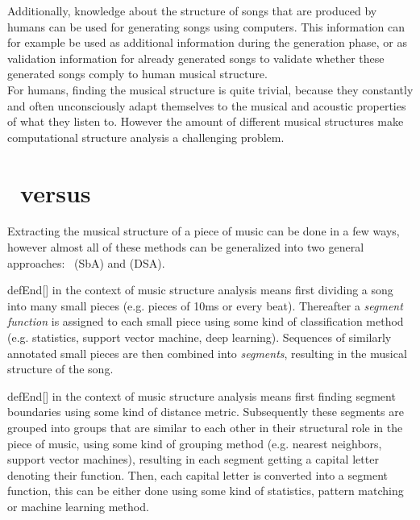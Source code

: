 Additionally, knowledge about the structure of songs that are produced by humans can be used for generating songs using computers. This information can for example be used as additional information during the generation phase, or as validation information for already generated songs to validate whether these generated songs comply to human musical structure.\\

For humans, finding the musical structure is quite trivial, because they constantly and often unconsciously adapt themselves to the musical and acoustic properties of what they listen to. However the amount of different musical structures make computational structure analysis a challenging problem.


\section[SbA vs DSA]{\sba\ versus\\ \dsa}
Extracting the musical structure of a piece of music can be done in a few ways, however almost all of these methods can be generalized into two general approaches: \textit{\sba}\ (SbA) and \textit{\dsa} (DSA).

\begin{theoremEnd}[restate,category=def]{defEnd}[\sba]
    \label{def:SbA}
    \textbf{\sba} in the context of music structure analysis means first dividing a song into many small pieces (e.g. pieces of 10ms or every beat). Thereafter a \textit{segment function} is assigned to each small piece using some kind of classification method (e.g. statistics, support vector machine, deep learning). Sequences of similarly annotated small pieces are then combined into \textit{segments}, resulting in the musical structure of the song.
\end{theoremEnd}

\begin{theoremEnd}[restate,category=def]{defEnd}[\dsa]
    \label{def:DSA}
    \textbf{\dsa} in the context of music structure analysis means first finding segment boundaries using some kind of distance metric. Subsequently these segments are grouped into groups that are similar to each other in their structural role in the piece of music, using some kind of grouping method (e.g. nearest neighbors, support vector machines), resulting in each segment getting a capital letter denoting their function. Then, each capital letter is converted into a segment function, this can be either done using some kind of statistics, pattern matching or machine learning method.
\end{theoremEnd} 

